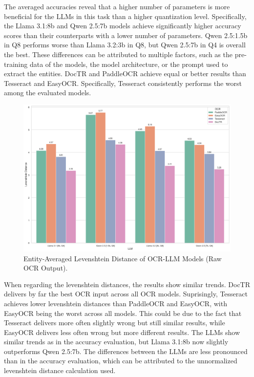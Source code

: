 \documentclass[11pt]{article}
\begin{document}
The averaged accuracies reveal that a higher number of parameters is more beneficial for the LLMs in this task than a higher quantization level. Specifically, the Llama 3.1:8b and Qwen 2.5:7b models achieve significantly higher accuracy scores than their counterparts with a lower number of parameters. Qwen 2.5:1.5b in Q8 performs worse than Llama 3.2:3b in Q8, but Qwen 2.5:7b in Q4 is overall the best. These differences can be attributed to multiple factors, such as the pre-training data of the models, the model architecture, or the prompt used to extract the entities. DocTR and PaddleOCR achieve equal or better results than Tesseract and EasyOCR. Specifically, Tesseract consistently performs the worst among the evaluated models.


\begin{figure}[h!]
    \centering
    \includegraphics[width=0.7\linewidth]{figures/eval_ocr_llm_levdist_avg.png}
    \caption{Entity-Averaged Levenshtein Distance of OCR-LLM Models (Raw OCR Output).}
    \label{fig:eval_ocr_llm_levdist_avg}
\end{figure}

When regarding the levenshtein distances, the results show similar trends. DocTR delivers by far the best OCR input across all OCR models. Suprisingly, Tesseract achieves lower levenshtein distances than PaddleOCR and EasyOCR, with EasyOCR being the worst across all models. This could be due to the fact that Tesseract delivers more often slightly wrong but still similar results, while EasyOCR delivers less often wrong but more different results. The LLMs show similar trends as in the accuracy evaluation, but Llama 3.1:8b now slightly outperforms Qwen 2.5:7b. The differences between the LLMs are less pronounced than in the accuracy evaluation, which can be attributed to the unnormalized levenshtein distance calculation used.
\end{document}
